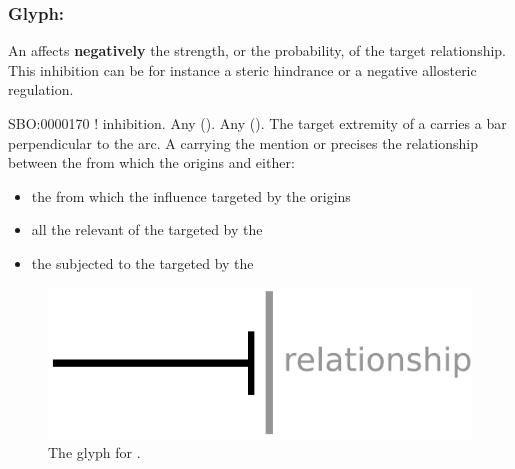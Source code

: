 
\subsubsection{Glyph: }\label{sec:inhibition}

An  affects \textbf{negatively}  the strength, or the probability, of the target relationship. This inhibition can be for instance a steric hindrance or a negative allosteric regulation.

\begin{glyphDescription}
 \glyphSboTerm SBO:0000170 ! inhibition.
 \glyphOrigin Any  ().
 \glyphTarget Any  ().
 \glyphEndPoint The target extremity of a  carries a bar perpendicular to the arc.
 \glyphAux A  carrying the mention  or  precises the relationship between the  from which the  origins and either:
\begin{itemize}
\item the  from which the influence targeted by the  origins
\item all the relevant  of the  targeted by the 
\item the  subjected to the  targeted by the 
\end{itemize}
 \end{glyphDescription}

\begin{figure}[H]
  \centering
  \includegraphics[scale = 0.5]{images/inhibition}
  \caption{The \ER glyph for .}
  \label{fig:inhibition}
\end{figure}

